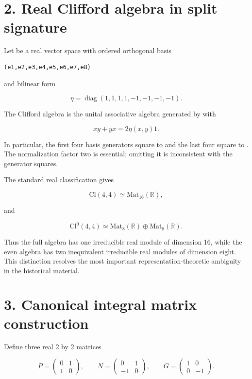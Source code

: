 \documentclass[11pt]{article}
\begin{document}
\section{2. Real Clifford algebra in split signature}

Let \texttt{} be a real vector space with ordered orthogonal basis

\begin{Verbatim}[fontsize=\small]
(e1,e2,e3,e4,e5,e6,e7,e8)
\end{Verbatim}

and bilinear form

\[
\eta=\operatorname{diag}(1,1,1,1,-1,-1,-1,-1).
\]

The Clifford algebra is the unital associative algebra generated by \texttt{} with

\[
xy+yx=2\eta(x,y)1.
\]

In particular, the first four basis generators square to \texttt{} and the last four square to \texttt{}. The normalization factor two is essential; omitting it is inconsistent with the generator squares.

The standard real classification gives

\[
\mathrm{Cl}(4,4)\simeq \mathrm{Mat}_{16}(\mathbb R),
\]

and

\[
\mathrm{Cl}^{0}(4,4)
\simeq \mathrm{Mat}_{8}(\mathbb R)\oplus
\mathrm{Mat}_{8}(\mathbb R).
\]

Thus the full algebra has one irreducible real module of dimension 16, while the even algebra has two inequivalent irreducible real modules of dimension eight. This distinction resolves the most important representation-theoretic ambiguity in the historical material.

\section{3. Canonical integral matrix construction}

Define three real 2 by 2 matrices

\[
P=\begin{pmatrix}0&1\\1&0\end{pmatrix},\qquad
N=\begin{pmatrix}0&1\\-1&0\end{pmatrix},\qquad
G=\begin{pmatrix}1&0\\0&-1\end{pmatrix}.
\]
\end{document}
